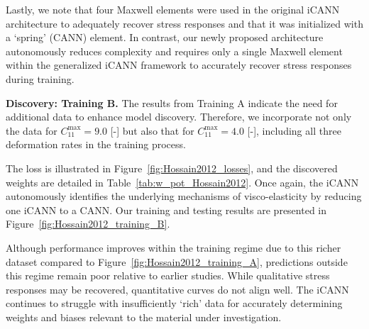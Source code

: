 Lastly, we note that four Maxwell elements were used in the original iCANN architecture to adequately recover stress responses and that it was initialized with a `spring' (CANN) element.
In contrast, our newly proposed architecture autonomously reduces complexity and requires only a single Maxwell element within the generalized iCANN framework to accurately recover stress responses during training.\newline

\textbf{Discovery: Training B.} The results from Training A indicate the need for additional data to enhance model discovery. 
Therefore, we incorporate not only the data for $ C_{11}^{\text{max}} = 9.0 $ [-] but also that for $ C_{11}^{\text{max}} = 4.0 $ [-], including all three deformation rates in the training process.

The loss is illustrated in Figure~\ref{fig:Hossain2012_losses}, and the discovered weights are detailed in Table~\ref{tab:w_pot_Hossain2012}. 
Once again, the iCANN autonomously identifies the underlying mechanisms of visco-elasticity by reducing one iCANN to a CANN. 
Our training and testing results are presented in Figure~\ref{fig:Hossain2012_training_B}.

Although performance improves within the training regime due to this richer dataset compared to Figure~\ref{fig:Hossain2012_training_A}, predictions outside this regime remain poor relative to earlier studies. 
While qualitative stress responses may be recovered, quantitative curves do not align well. 
The iCANN continues to struggle with insufficiently `rich' data for accurately determining weights and biases relevant to the material under investigation.

